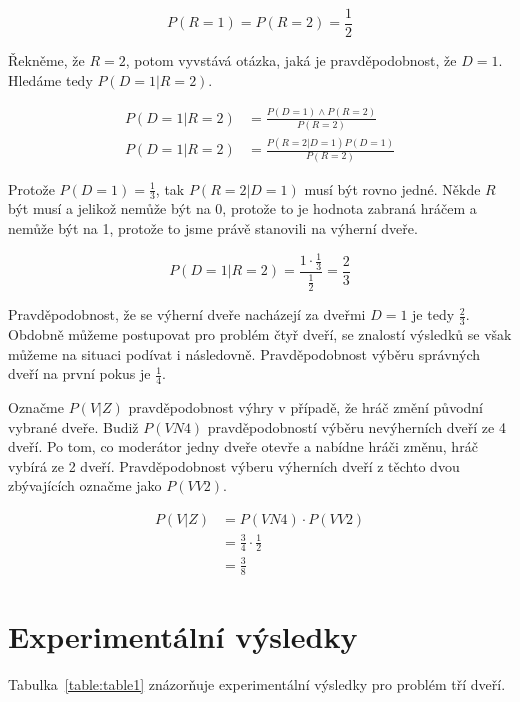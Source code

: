 \begin{equation}
    P(R = 1) = P(R = 2) = \frac{1}{2}
\end{equation}

Řekněme, že \( R = 2 \), potom vyvstává otázka, jaká je pravděpodobnost, že \( D = 1 \).
Hledáme tedy \( P(D = 1 | R = 2) \).

\begin{align}
    P(D = 1 | R = 2) &= \frac{P(D = 1) \land P(R = 2)}{P(R = 2)} \\
    P(D = 1 | R = 2) &= \frac{P(R = 2 | D = 1) P(D = 1)}{P(R = 2)}
\end{align}

Protože \( P(D = 1) = \frac{1}{3} \), tak \( P(R = 2 | D = 1) \) musí být rovno jedné.
Někde \( R \) být musí a jelikož nemůže být na 0, protože to je hodnota zabraná hráčem a nemůže být na 1, protože to jsme právě stanovili na výherní dveře.

\begin{equation}
    P(D = 1 | R = 2) = \frac{1 \cdot \frac{1}{3}}{\frac{1}{2}} = \frac{2}{3}
\end{equation}

Pravděpodobnost, že se výherní dveře nacházejí za dveřmi \( D = 1 \) je tedy \( \frac{2}{3} \).
Obdobně můžeme postupovat pro problém čtyř dveří, se znalostí výsledků se však můžeme na situaci podívat i následovně.
Pravděpodobnost výběru správných dveří na první pokus je \( \frac{1}{4} \).

Označme \( P(V | Z) \) pravděpodobnost výhry v případě, že hráč změní původní vybrané dveře.
Budiž \( P(VN4) \) pravděpodobností výběru nevýherních dveří ze 4 dveří.
Po tom, co moderátor jedny dveře otevře a nabídne hráči změnu, hráč vybírá ze 2 dveří.
Pravděpodobnost výberu výherních dveří z těchto dvou zbývajících označme jako \( P(VV2) \).

\begin{align}
    P(V | Z)    &= P(VN4) \cdot P(VV2) \\
                &= \frac{3}{4} \cdot \frac{1}{2} \\
                &= \frac{3}{8}
\end{align}

\section{Experimentální výsledky}

Tabulka~\ref{table:table1} znázorňuje experimentální výsledky pro problém tří dveří.

